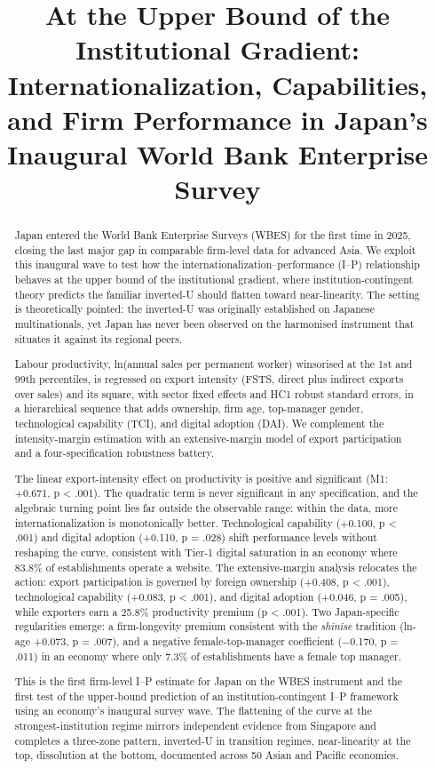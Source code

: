 \documentclass[
  12pt,a4paper]{article}
\title{At the Upper Bound of the Institutional Gradient:
Internationalization, Capabilities, and Firm Performance in Japan's
Inaugural World Bank Enterprise Survey}
\author{}
\date{}
\begin{document}
\maketitle
\begin{abstract}
Japan entered the World Bank Enterprise Surveys (WBES) for the first
time in 2025, closing the last major gap in comparable firm-level data
for advanced Asia. We exploit this inaugural wave to test how the
internationalization--performance (I--P) relationship behaves at the
upper bound of the institutional gradient, where institution-contingent
theory predicts the familiar inverted-U should flatten toward
near-linearity. The setting is theoretically pointed: the inverted-U was
originally established on Japanese multinationals, yet Japan has never
been observed on the harmonised instrument that situates it against its
regional peers.

Labour productivity, ln(annual sales per permanent worker) winsorised at
the 1st and 99th percentiles, is regressed on export intensity (FSTS,
direct plus indirect exports over sales) and its square, with sector
fixed effects and HC1 robust standard errors, in a hierarchical sequence
that adds ownership, firm age, top-manager gender, technological
capability (TCI), and digital adoption (DAI). We complement the
intensity-margin estimation with an extensive-margin model of export
participation and a four-specification robustness battery.

The linear export-intensity effect on productivity is positive and
significant (M1: +0.671, p \textless{} .001). The quadratic term is
never significant in any specification, and the algebraic turning point
lies far outside the observable range: within the data, more
internationalization is monotonically better. Technological capability
(+0.100, p \textless{} .001) and digital adoption (+0.110, p = .028)
shift performance levels without reshaping the curve, consistent with
Tier-1 digital saturation in an economy where 83.8\% of establishments
operate a website. The extensive-margin analysis relocates the action:
export participation is governed by foreign ownership (+0.408, p
\textless{} .001), technological capability (+0.083, p \textless{}
.001), and digital adoption (+0.046, p = .005), while exporters earn a
25.8\% productivity premium (p \textless{} .001). Two Japan-specific
regularities emerge: a firm-longevity premium consistent with the
\emph{shinise} tradition (ln-age +0.073, p = .007), and a negative
female-top-manager coefficient (−0.170, p = .011) in an economy where
only 7.3\% of establishments have a female top manager.

This is the first firm-level I--P estimate for Japan on the WBES
instrument and the first test of the upper-bound prediction of an
institution-contingent I--P framework using an economy's inaugural
survey wave. The flattening of the curve at the strongest-institution
regime mirrors independent evidence from Singapore and completes a
three-zone pattern, inverted-U in transition regimes, near-linearity at
the top, dissolution at the bottom, documented across 50 Asian and
Pacific economies.
\end{abstract}
\end{document}
